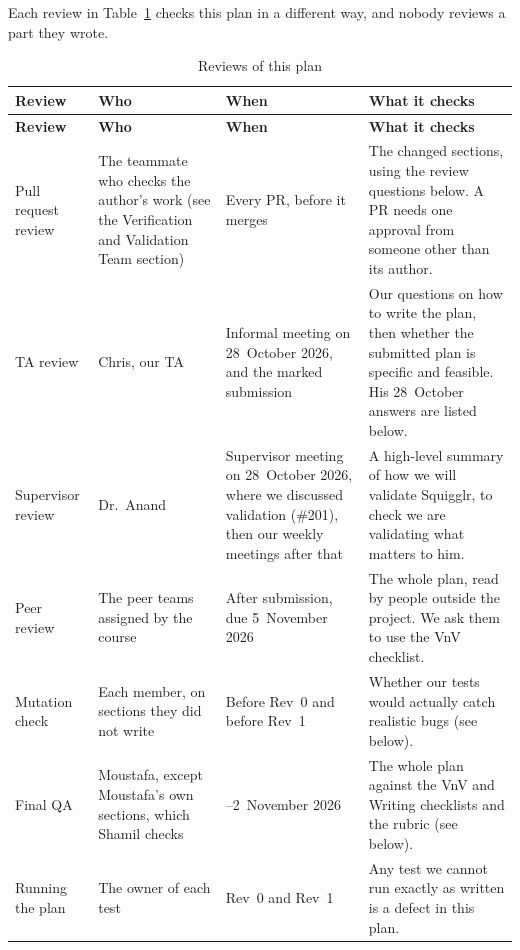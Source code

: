 \documentclass[12pt, titlepage]{article}
\begin{document}
Each review in Table~\ref{tab:planReviews} checks this plan in a different way,
and nobody reviews a part they wrote.

{\small
\begin{longtable}{@{}>{\raggedright\arraybackslash}p{}
  >{\raggedright\arraybackslash}p{}
  >{\raggedright\arraybackslash}p{}
  >{\raggedright\arraybackslash}p{}@{}}
\caption{Reviews of this plan}
\label{tab:planReviews}\\
\toprule
\textbf{Review} & \textbf{Who} & \textbf{When} & \textbf{What it checks} \\
\midrule
\endfirsthead
\toprule
\textbf{Review} & \textbf{Who} & \textbf{When} & \textbf{What it checks} \\
\midrule
\endhead
\bottomrule
\endlastfoot
Pull request review & The teammate who checks the author's work (see the
Verification and Validation Team section) & Every PR, before it merges & The
changed sections, using the review questions below.
A PR needs one approval from someone other than its author. \\
\addlinespace
TA review & Chris, our TA & Informal meeting on 28~October 2026, and the
marked submission & Our questions on how to write the plan, then whether the
submitted plan is specific and feasible. His 28~October answers are listed
below. \\
\addlinespace
Supervisor review & Dr.\ Anand & Supervisor meeting on 28~October 2026, where
we discussed validation (\#201), then our weekly meetings after that & A high-level
summary of how we will validate Squigglr, to check we are validating what
matters to him. \\
\addlinespace
Peer review & The peer teams assigned by the course & After submission, due
5~November 2026 & The whole plan, read by people outside the project. We ask
them to use the VnV checklist. \\
\addlinespace
Mutation check & Each member, on sections they did not write & Before Rev~0
and before Rev~1 & Whether our tests would actually
catch realistic bugs (see below). \\
\addlinespace
Final QA & Moustafa, except Moustafa's own sections, which Shamil checks &
1--2~November 2026 & The whole plan against the VnV and Writing checklists and
the rubric (see below). \\
\addlinespace
Running the plan & The owner of each test & Rev~0 and Rev~1 & Any test we
cannot run exactly as written is a defect in this plan. \\
\end{longtable}
}
\end{document}
